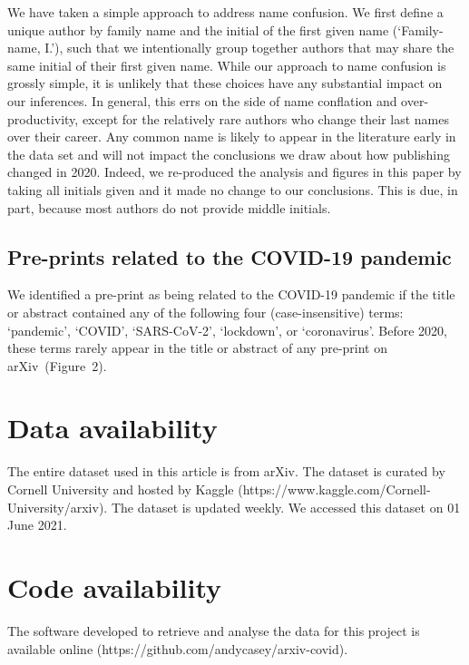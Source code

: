 \documentclass[a4paper,12pt]{article}
\newcommand{\arxiv}{arXiv}
\begin{document}
We have taken a simple approach to address name confusion. We first define a unique author by family name and the initial of the first given name (`Family-name, I.'), such that we intentionally group together authors that may share the same initial of their first given name. 
While our approach to name confusion is grossly simple, it is unlikely that these choices have any substantial impact on our inferences. In general, this errs on the side of name conflation and over-productivity, except for the relatively rare authors who change their last names over their career.
Any common name is likely to appear in the literature early in the data set and will not impact the conclusions we draw about how publishing changed in 2020. Indeed, we re-produced the analysis and figures in this paper by taking all initials given and it made no change to our conclusions. This is due, in part, because most authors do not provide middle initials.


\subsection*{Pre-prints related to the COVID-19 pandemic}

We identified a pre-print as being related to the COVID-19 pandemic if the title or abstract contained any of the following four (case-insensitive) terms: `pandemic', `COVID', `SARS-CoV-2', `lockdown', or `coronavirus'. Before 2020, these terms rarely appear in the title or abstract of any pre-print on \arxiv\ (Figure~2).

\section*{Data availability}

The entire dataset used in this article is from \arxiv. The dataset is curated by Cornell University and hosted by Kaggle (https://www.kaggle.com/Cornell-University/arxiv). The dataset is updated weekly. We accessed this dataset on 01 June 2021.



\section*{Code availability}
The software developed to retrieve and analyse the data for this project is available online (https://github.com/andycasey/arxiv-covid).


\end{document}
